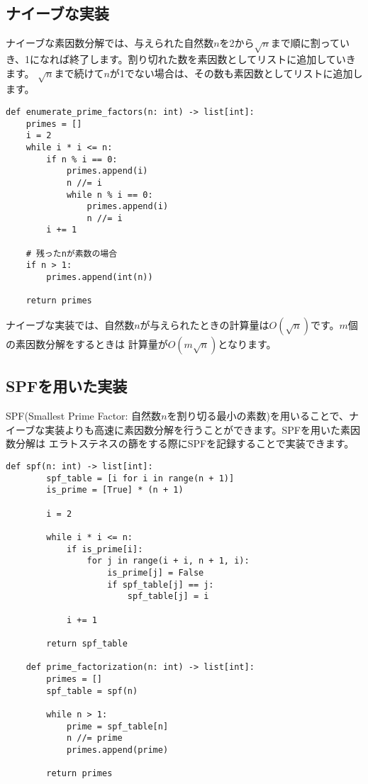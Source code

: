 \documentclass{jlreq}
\begin{document}
\subsection{ナイーブな実装}

ナイーブな素因数分解では、与えられた自然数$n$を2から$\sqrt{n}$まで順に割っていき、1になれば終了します。割り切れた数を素因数としてリストに追加していきます。
$\sqrt{n}$まで続けて$n$が1でない場合は、その数も素因数としてリストに追加します。

\begin{lstlisting}[caption=ナイーブな素因数分解の実装の実装, label=factor, frame=TRBL]
def enumerate_prime_factors(n: int) -> list[int]:
    primes = []
    i = 2
    while i * i <= n:
        if n % i == 0:
            primes.append(i)
            n //= i
            while n % i == 0:
                primes.append(i)
                n //= i
        i += 1

    # 残ったnが素数の場合
    if n > 1:
        primes.append(int(n))

    return primes
\end{lstlisting}

ナイーブな実装では、自然数$n$が与えられたときの計算量は$O(\sqrt{n})$です。$m$個の素因数分解をするときは
計算量が$O(m \sqrt{n})$となります。 

\subsection{SPFを用いた実装}

SPF(Smallest Prime Factor: 自然数$n$を割り切る最小の素数)を用いることで、ナイーブな実装よりも高速に素因数分解を行うことができます。SPFを用いた素因数分解は
エラトステネスの篩をする際にSPFを記録することで実装できます。

\begin{lstlisting}[caption=SPFを用いた素因数分解の実装, label=spf, frame=TRBL]
def spf(n: int) -> list[int]:
        spf_table = [i for i in range(n + 1)]
        is_prime = [True] * (n + 1)
        
        i = 2
        
        while i * i <= n:
            if is_prime[i]:
                for j in range(i + i, n + 1, i):
                    is_prime[j] = False
                    if spf_table[j] == j:
                        spf_table[j] = i
            
            i += 1
            
        return spf_table 
    
    def prime_factorization(n: int) -> list[int]:
        primes = []
        spf_table = spf(n)
        
        while n > 1:
            prime = spf_table[n]
            n //= prime
            primes.append(prime)
        
        return primes
\end{lstlisting}
\end{document}
